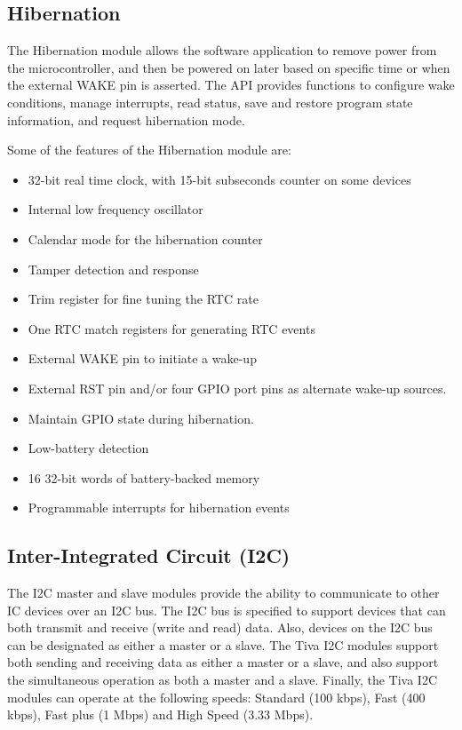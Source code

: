 \documentclass{article}
\begin{document}
\subsection{Hibernation}
The Hibernation module allows the software application to remove power
from the microcontroller, and then be powered on later based on
specific time or when the external WAKE pin is asserted. The API
provides functions to configure wake conditions, manage interrupts,
read status, save and restore program state information, and request
hibernation mode.

Some of the features of the Hibernation module are:
\begin{itemize}
    \item 32-bit real time clock, with 15-bit subseconds counter on some devices
    \item Internal low frequency oscillator
    \item Calendar mode for the hibernation counter
    \item Tamper detection and response
    \item Trim register for fine tuning the RTC rate
    \item One RTC match registers for generating RTC events
    \item External WAKE pin to initiate a wake-up
    \item External RST pin and/or four GPIO port pins as alternate
          wake-up sources.
    \item Maintain GPIO state during hibernation.
    \item Low-battery detection
    \item 16 32-bit words of battery-backed memory
    \item Programmable interrupts for hibernation events
\end{itemize}
\subsection{Inter-Integrated Circuit (I2C)}
The I2C master and slave modules provide the ability to communicate to
other IC devices over an I2C bus. The I2C bus is specified to support
devices that can both transmit and receive (write and read) data. Also,
devices on the I2C bus can be designated as either a master or a slave.
The Tiva I2C modules support both sending and receiving data as either
a master or a slave, and also support the simultaneous operation as
both a master and a slave. Finally, the Tiva I2C modules can operate at
the following speeds: Standard (100 kbps), Fast (400 kbps), Fast plus
(1 Mbps) and High Speed (3.33 Mbps).
\end{document}
